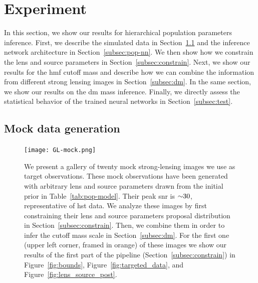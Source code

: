 \section{Experiment} 
\label{sec:sl-results}


In this section, we show our results for hierarchical population parameters inference. First, we describe the simulated data in Section~\ref{subsec:pop-data} and the inference network architecture in Section~\ref{subsec:pop-nn}. We then show how we constrain the lens and source parameters in Section~\ref{subsec:constrain}. Next, we show our results for the \gls*{hmf} cutoff mass and describe how we can combine the information from different strong lensing images in Section~\ref{subsec:dm}. In the same section, we show our results on the \gls*{dm} mass inference. Finally, we directly assess the statistical behavior of the trained neural networks in Section~\ref{subsec:test}.

\subsection{Mock data generation} 
\label{subsec:pop-data}

\begin{figure}
    \centering
    \texttt{[image: GL-mock.png]}
    \caption{We present a gallery of twenty mock strong-lensing images we use as target observations. These mock observations have been generated with arbitrary lens and source parameters drawn from the initial prior in Table~\ref{tab:pop-model}. Their peak \gls*{snr} is $\num{\sim 30}$, representative of \gls*{hst} data. We analyze these images by first constraining their lens and source parameters proposal distribution in Section~\ref{subsec:constrain}. Then, we combine them in order to infer the cutoff mass scale in Section~\ref{subsec:dm}. For the first one (upper left corner, framed in orange) of these images we show our results of the first part of the pipeline (Section~\ref{subsec:constrain}) in Figure~\ref{fig:bounds}, Figure~\ref{fig:targeted_data}, and Figure~\ref{fig:lens_source_post}.
}
\label{fig:mock}
\end{figure}

